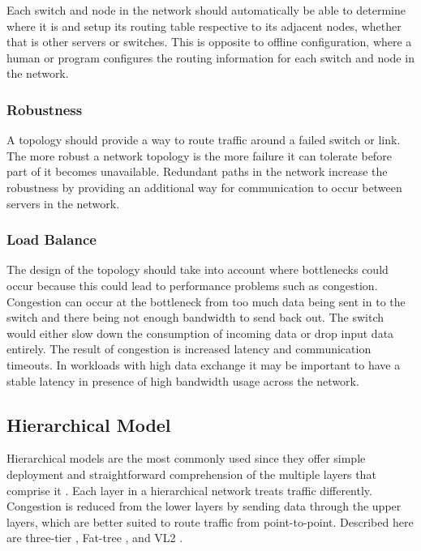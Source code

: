 \documentclass[fullapage,12pt]{article}
\begin{document}
Each switch and node in the network should automatically be able to determine where it is and setup its routing table respective to its adjacent nodes, whether that is other servers or switches. This is opposite to offline configuration, where a human or program configures the routing information for each switch and node in the network.


\subsubsection{Robustness} \label{ssub:net-robustness}

A topology should provide a way to route traffic around a failed switch or link. The more robust a network topology is the more failure it can tolerate before part of it becomes unavailable. Redundant paths in the network increase the robustness by providing an additional way for communication to occur between servers in the network.


\subsubsection{Load Balance} \label{ssub:net-load-balance}

The design of the topology should take into account where bottlenecks could occur because this could lead to performance problems such as congestion. Congestion can occur at the bottleneck from too much data being sent in to the switch and there being not enough bandwidth to send back out. The switch would either slow down the consumption of incoming data or drop input data entirely. The result of congestion is increased latency and communication timeouts. In workloads with high data exchange it may be important to have a stable latency in presence of high bandwidth usage across the network.





\subsection{Hierarchical Model} \label{sub:net-hierarchical}

Hierarchical models are the most commonly used since they offer simple deployment and straightforward comprehension of the multiple layers that comprise it \cite{wang2015survey, xia2016survey}. Each layer in a hierarchical network treats traffic differently. Congestion is reduced from the lower layers by sending data through the upper layers, which are better suited to route traffic from point-to-point. Described here are three-tier \cite{kliazovich2012greencloud}, Fat-tree \cite{al2008scalable}, and VL2 \cite{greenberg2009vl2}.
\end{document}
